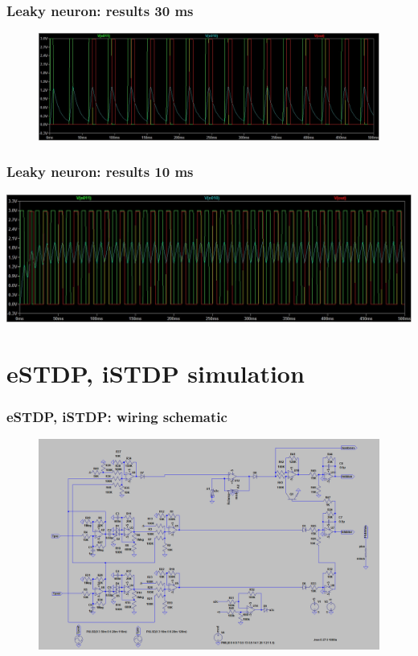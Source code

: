 \documentclass[12pt, aspectratio=169]{beamer}
\begin{document}
\begin{frame}
\frametitle{Leaky neuron: results 30 ms}
\begin{figure}
\includegraphics[width=0.85\linewidth]{30}
\end{figure}
\end{frame}


\begin{frame}
\frametitle{Leaky neuron: results 10 ms}
\centering
\includegraphics[width=0.85\linewidth]{10}
\end{frame}

\section{eSTDP, iSTDP simulation}

\begin{frame}
\frametitle{eSTDP, iSTDP: wiring schematic}
\begin{figure}
\includegraphics[width=0.85\linewidth]{da_modulation_sch}
\end{figure}
\end{frame}
\end{document}

